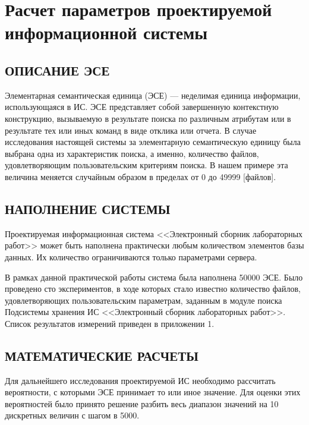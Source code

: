 \documentclass[a4paper,14pt]{extarticle}
\begin{document}
%
%
\clearpage
\section{Расчет параметров проектируемой информационной	системы}

\subsection{ОПИСАНИЕ ЭСЕ}

Элементарная семантическая единица (ЭСЕ) --- неделимая единица
информации, использующаяся в ИС. ЭСЕ представляет собой завершенную
контекстную конструкцию, вызываемую в результате поиска по различным
атрибутам или в результате тех или иных команд в виде отклика или отчета. В случае исследования настоящей системы за элементарную семантическую единицу была выбрана одна из характеристик поиска, а именно, количество файлов, удовлетворяющим пользовательским критериям поиска. В нашем примере эта величина меняется случайным
образом в пределах от 0 до 49999 [файлов].


\subsection{НАПОЛНЕНИЕ СИСТЕМЫ}

Проектируемая информационная система <<Электронный сборник лабораторных работ>> может быть наполнена
практически любым количеством элементов базы данных. Их количество
ограничиваются только параметрами сервера.

В рамках данной практической работы система была наполнена 50000 ЭСЕ. Было проведено сто экспериментов, в ходе которых стало известно количество файлов, удовлетворяющих пользовательским параметрам, заданным в модуле поиска Подсистемы хранения ИС <<Электронный сборник лабораторных работ>>. Список результатов измерений приведен в приложении 1.


\subsection{МАТЕМАТИЧЕСКИЕ РАСЧЕТЫ}
Для дальнейшего исследования проектируемой ИС необходимо
рассчитать вероятности, с которыми ЭСЕ принимает то или иное значение.
Для оценки этих вероятностей было принято решение разбить весь диапазон
значений на 10 дискретных величин с шагом в 5000. 
\end{document}
